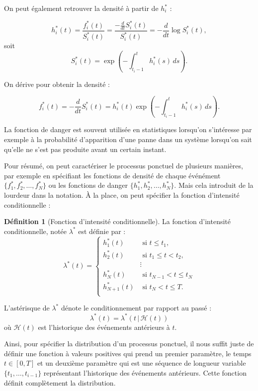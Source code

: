 \documentclass{article}
\theoremstyle{definition}
\newtheorem{defn}{Définition}[section]
\theoremstyle{remark}
\begin{document}
On peut également retrouver la densité à partir de $h^*_i$ :

$$h^*_i(t) = \frac{f^*_i(t)}{S^*_i(t)}
= \frac{-\frac{d}{dt}S^*_i(t)}{S^*_i(t)}
= -\frac{d}{dt}\log S^*_i(t),$$
soit $$S^*_i(t) = \exp\left(-\int_{t_i-1}^t h^*_i(s)\, ds\right).$$

On dérive pour obtenir la densité :

$$f^*_i(t) = -\frac{d}{dt}S^*_i(t) = h^*_i(t)
\exp\left(-\int_{t_i-1}^t h^*_i(s)\, ds\right).$$

La fonction de danger est souvent utilisée en statistiques lorsqu'on
s'intéresse par exemple à la probabilité d'apparition d'une panne dans
un système lorsqu'on sait qu'elle ne s'est pas produite avant un certain
instant.

Pour résumé, on peut caractériser le processus ponctuel de plusieurs manières,
par exemple en spécifiant les fonctions de densité de chaque événément
$\{f^*_1, f^*_2, \dots, f^*_N\}$ ou les fonctions de danger
$\{h^*_1, h^*_2, \dots, h^*_N\}$. Mais cela introduit de la lourdeur dans
la notation. À la place, on peut spécifier la fonction d'intensité
conditionnelle :

\begin{defn}[Fonction d'intensité conditionnelle]
La fonction d'intensité conditionnelle, notée $\lambda^*$ est définie par :
$$\lambda^*(t) =
\begin{cases}
h^*_1(t) & \text{ si } t \leq t_1, \\
h^*_2(t) & \text{ si } t_1 \leq t < t_2, \\
& \vdots \\
h^*_N (t) & \text{ si } t_{N-1} < t \leq t_N \\
h^*_{N+1} (t) & \text{ si } t_N < t \leq T. \\
\end{cases}$$
\end{defn}

L'astérisque de $\lambda^*$ dénote le conditionnement par rapport au passé :
$$\lambda^*(t) = \lambda^*(t \, |\,  \mathcal{H}(t))$$ où $\mathcal{H}(t)$
est l'historique des événements antérieurs à $t$.

Ainsi, pour spécifier la
distribution d'un processus ponctuel, il nous suffit juste de définir
une fonction à valeurs positives qui prend un premier paramètre, le
temps $t \in [0, T]$ et un deuxième paramètre qui est une séquence de
longueur variable $\{t_1, \dots, t_{i-1}\}$ représentant l'historique
des événements antérieurs. Cette fonction définit complètement
la distribution.
\end{document}

